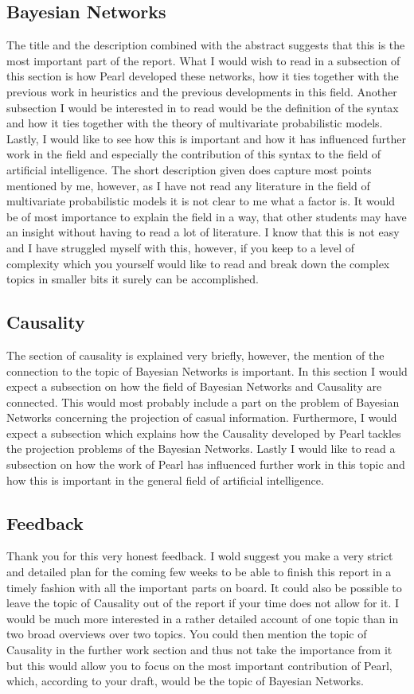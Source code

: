 \documentclass{article}
\begin{document}
\subsection{Bayesian Networks}
The title and the description combined with the abstract suggests that this is the most important part of the report. What I would wish to read in a subsection of this section is how Pearl developed these networks, how it ties together with the previous work in heuristics and the previous developments in this field.
Another subsection I would be interested in to read would be the definition of the syntax and how it ties together with the theory of multivariate probabilistic models.
Lastly, I would like to see how this is important and how it has influenced further work in the field and especially the contribution of this syntax to the field of artificial intelligence.
The short description given does capture most points mentioned by me, however, as I have not read any literature in the field of multivariate probabilistic models it is not clear to me what a factor is. It would be of most importance to explain the field in a way, that other students may have an insight without having to read a lot of literature. I know that this is not easy and I have struggled myself with this, however, if you keep to a level of complexity which you yourself would like to read and break down the complex topics in smaller bits it surely can be accomplished.

\subsection{Causality}
The section of causality is explained very briefly, however, the mention of the connection to the topic of Bayesian Networks is important.
In this section I would expect a subsection on how the field of Bayesian Networks and Causality are connected. This would most probably include a part on the problem of Bayesian Networks concerning the projection of casual information.
Furthermore, I would expect a subsection which explains how the Causality developed by Pearl tackles the projection problems of the Bayesian Networks. 
Lastly I would like to read a subsection on how the work of Pearl has influenced further work in this topic and how this is important in the general field of artificial intelligence.

\subsection{Feedback}
\label{feedback}
Thank you for this very honest feedback. I wold suggest you make a very strict and detailed plan for the coming few weeks to be able to finish this report in a timely fashion with all the important parts on board. It could also be possible to leave the topic of Causality out of the report if your time does not allow for it. I would be much more interested in a rather detailed account of one topic than in two broad overviews over two topics. You could then mention the topic of Causality in the further work section and thus not take the importance from it but this would allow you to focus on the most important contribution of Pearl, which, according to your draft, would be the topic of Bayesian Networks.
\end{document}
